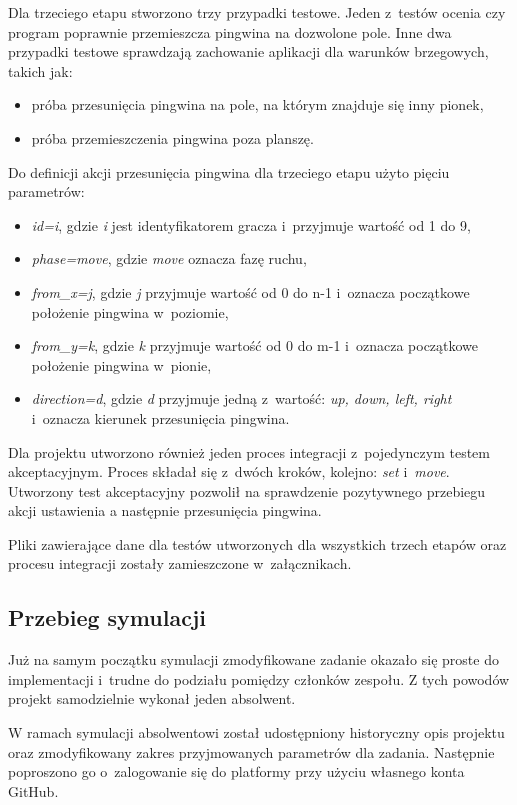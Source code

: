 Dla trzeciego etapu stworzono trzy przypadki testowe.
Jeden z~testów ocenia czy program poprawnie przemieszcza pingwina na dozwolone pole.
Inne dwa przypadki testowe sprawdzają zachowanie aplikacji dla warunków brzegowych, takich jak:
\begin{itemize}
    \item próba przesunięcia pingwina na pole, na którym znajduje się inny pionek,
    \item próba przemieszczenia pingwina poza planszę.
\end{itemize}

Do definicji akcji przesunięcia pingwina dla trzeciego etapu użyto pięciu parametrów:
\begin{itemize}
    \item \textit{id=i}, gdzie \textit{i} jest identyfikatorem gracza i~przyjmuje wartość od 1 do 9,
    \item \textit{phase=move}, gdzie \textit{move} oznacza fazę ruchu,
    \item \textit{from\_x=j}, gdzie \textit{j} przyjmuje wartość od 0 do n-1 i~oznacza początkowe położenie pingwina w~poziomie,
    \item \textit{from\_y=k}, gdzie \textit{k} przyjmuje wartość od 0 do m-1 i~oznacza początkowe położenie pingwina w~pionie,
    \item \textit{direction=d}, gdzie \textit{d} przyjmuje jedną z~wartość: \textit{up, down, left, right} i~oznacza kierunek przesunięcia pingwina.
\end{itemize}

Dla projektu utworzono również jeden proces integracji z~pojedynczym testem akceptacyjnym.
Proces składał się z~dwóch kroków, kolejno: \textit{set} i~\textit{move}.
Utworzony test akceptacyjny pozwolił na sprawdzenie pozytywnego przebiegu akcji ustawienia a następnie przesunięcia pingwina.

Pliki zawierające dane dla testów utworzonych dla wszystkich trzech etapów oraz procesu integracji zostały zamieszczone w~załącznikach.

\subsection{Przebieg symulacji}
\label{penguins_simulation}
Już na samym początku symulacji zmodyfikowane zadanie okazało się proste do implementacji i~trudne do podziału pomiędzy członków zespołu.
Z tych powodów projekt samodzielnie wykonał jeden absolwent.

W ramach symulacji absolwentowi został udostępniony historyczny opis projektu oraz zmodyfikowany zakres przyjmowanych parametrów dla zadania.
Następnie poproszono go o~zalogowanie się do platformy przy użyciu własnego konta GitHub.

